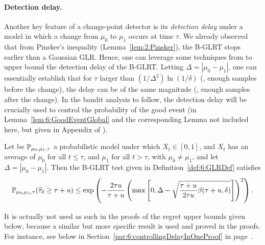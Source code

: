 \paragraph{Detection delay.}

Another key feature of a change-point detector is its \emph{detection delay} under a model in which a change from $\mu_0$ to $\mu_1$ occurs at time $\tau$. We already observed that from Pinsker's inequality (Lemma~\ref{lem:2:Pinsker}), the B-GLRT stops earlier than a Gaussian GLR. Hence, one can leverage some techniques from \cite{Maillard2018GLR} to upper bound the detection delay of the B-GLRT. Letting $\Delta = |\mu_0 - \mu_1|$, one can essentially establish that for $\tau$ larger than $(1/\Delta^2)\ln(1/\delta)$ (\ie, enough samples before the change), the delay can be of the same magnitude (\ie, enough samples after the change).
In the bandit analysis to follow, the detection delay will be crucially used to control the probability of the good event (in Lemma~\ref{lem:6:GoodEventGlobal} and the corresponding Lemma not included here, but given in Appendix of \cite{Besson2019GLRT}).

\begin{lemma}\label{lem:6:Delay}
\begin{leftbar}[lemmabar]  %
    Let be $\mathbb{P}_{\mu_0,\mu_1,\tau}$ a probabilistic model under which $X_t \in [0,1]$, and $X_t$ has an average of $\mu_0$ for all $t \leq \tau$, and $\mu_1$ for all $t > \tau$, with $\mu_0 \neq \mu_1$,
    and let $\Delta = |\mu_0 - \mu_1|$.
    Then the B-GLRT test given in Definition~\ref{def:6:GLRDef} satisfies
    \begin{equation}
        \mathbb{P}_{\mu_0,\mu_1,\tau} (\widehat{\tau}_{\delta} \geq \tau + u) \leq \exp\left( -\frac{2\tau u}{\tau + u}\left(\max\left[ 0, \Delta - \sqrt{\frac{\tau + u}{2\tau u} \beta(\tau + u,\delta)} \right]\right)^2 \right).
    \end{equation}
\end{leftbar}  %
\end{lemma}
%
\begin{smallproof}
    It is actually not used as such in the proofs of the regret upper bounds given below, because a similar but more specific result is used and proved in the proofs.
    For instance, see below in Section~\ref{par:6:controllingDelayInOneProof} in page~\pageref{par:6:controllingDelayInOneProof}.
\end{smallproof}

